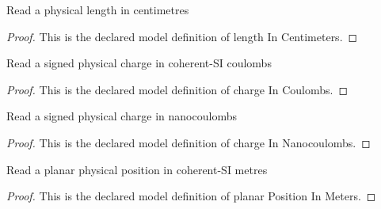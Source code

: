 \begin{definition}
  \label{def:physics:phyx-mini-0915:phyxminiproblems-problemphyxmini0915-lengthincentimeters}
  Read a physical length in centimetres
\end{definition}
\begin{proof}
  This is the declared model definition of length In Centimeters.
\end{proof}
\begin{definition}
  \label{def:physics:phyx-mini-0915:phyxminiproblems-problemphyxmini0915-chargeincoulombs}
  Read a signed physical charge in coherent-SI coulombs
\end{definition}
\begin{proof}
  This is the declared model definition of charge In Coulombs.
\end{proof}
\begin{definition}
  \label{def:physics:phyx-mini-0915:phyxminiproblems-problemphyxmini0915-chargeinnanocoulombs}
  Read a signed physical charge in nanocoulombs
\end{definition}
\begin{proof}
  This is the declared model definition of charge In Nanocoulombs.
\end{proof}
\begin{definition}
  \label{def:physics:phyx-mini-0915:phyxminiproblems-problemphyxmini0915-planarpositioninmeters}
  Read a planar physical position in coherent-SI metres
\end{definition}
\begin{proof}
  This is the declared model definition of planar Position In Meters.
\end{proof}
